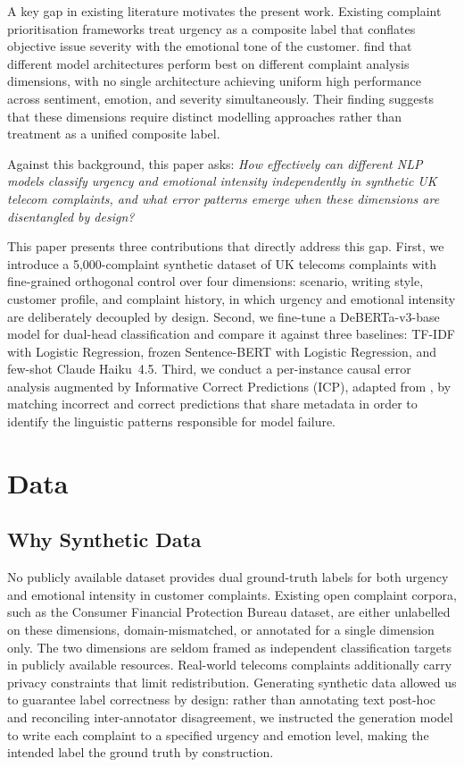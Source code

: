 \documentclass[11pt]{article}
\begin{document}
A key gap in existing literature motivates the present work. Existing complaint
prioritisation frameworks treat urgency as a composite label that conflates objective
issue severity with the emotional tone of the customer.
\citet{athira2025} find that different model architectures perform best on different
complaint analysis dimensions, with no single architecture achieving uniform high
performance across sentiment, emotion, and severity simultaneously. Their finding
suggests that these dimensions require distinct modelling approaches rather than
treatment as a unified composite label.

Against this background, this paper asks: \textit{How effectively can different NLP
models classify urgency and emotional intensity independently in synthetic UK telecom
complaints, and what error patterns emerge when these dimensions are disentangled by
design?}

This paper presents three contributions that directly address this gap. First, we
introduce a 5,000-complaint synthetic dataset of UK telecoms complaints with
fine-grained orthogonal control over four dimensions: scenario, writing style, customer
profile, and complaint history, in which urgency and emotional intensity are deliberately
decoupled by design. Second, we fine-tune a DeBERTa-v3-base model for dual-head
classification and compare it against three baselines: TF-IDF with Logistic Regression,
frozen Sentence-BERT with Logistic Regression, and few-shot Claude Haiku~4.5. Third, we
conduct a per-instance causal error analysis augmented by Informative Correct Predictions
(ICP), adapted from \citet{ashuryTahan2026}, by matching incorrect and correct
predictions that share metadata in order to identify the linguistic patterns responsible
for model failure.

\section{Data}

\subsection{Why Synthetic Data}

No publicly available dataset provides dual ground-truth labels for both urgency and
emotional intensity in customer complaints. Existing open complaint corpora, such as the
Consumer Financial Protection Bureau dataset, are either unlabelled on these dimensions,
domain-mismatched, or annotated for a single dimension only. The two dimensions are
seldom framed as independent classification targets in publicly available resources.
Real-world telecoms complaints additionally carry privacy constraints that limit
redistribution. Generating synthetic data allowed us to guarantee label correctness by
design: rather than annotating text post-hoc and reconciling inter-annotator
disagreement, we instructed the generation model to write each complaint to a specified
urgency and emotion level, making the intended label the ground truth by construction.
\end{document}
